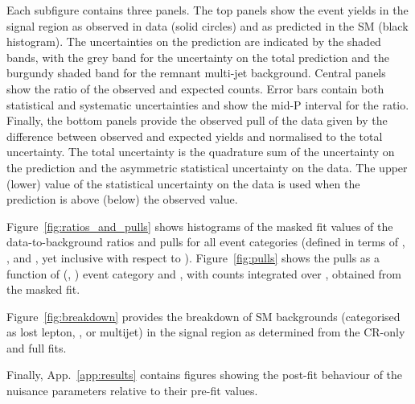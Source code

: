 Each subfigure contains three panels.  The top panels show the event
yields in the signal region as observed in data (solid circles) and as
predicted in the SM (black histogram).  The uncertainties on the
prediction are indicated by the shaded bands, with the grey band for
the uncertainty on the total prediction and the burgundy shaded band
for the remnant multi-jet background. Central panels show the ratio of
the observed and expected counts.  Error bars contain both statistical
and systematic uncertainties and show the mid-P interval for the
ratio. Finally, the bottom panels provide the observed pull of the
data given by the difference between observed and expected yields and
normalised to the total uncertainty.  The total uncertainty is the
quadrature sum of the uncertainty on the prediction and the asymmetric
statistical uncertainty on the data. The upper (lower) value of the
statistical uncertainty on the data is used when the prediction is
above (below) the observed value.


Figure~\ref{fig:ratios_and_pulls} shows histograms of the masked fit
values of the data-to-background ratios and pulls for all event
categories (defined in terms of \njet, \nb, and \scalht, yet inclusive
with respect to \mht). Figure~\ref{fig:pulls} shows the pulls as a
function of (\njet, \nb) event category and \scalht, with counts
integrated over \mht, obtained from the masked fit.

Figure~\ref{fig:breakdown} provides the breakdown of SM backgrounds
(categorised as lost lepton, \znunuj, or multijet) in the signal
region as determined from the CR-only and full fits.

Finally, App.~\ref{app:results} contains figures showing the post-fit
behaviour of the nuisance parameters relative to their pre-fit values.

